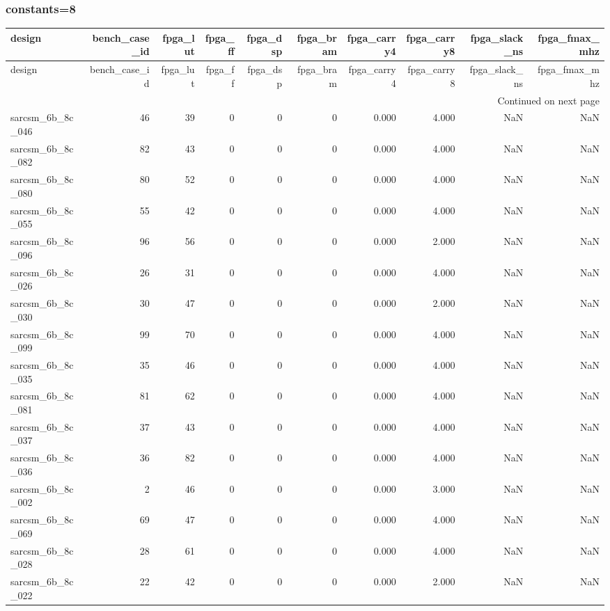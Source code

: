 \documentclass{article}
\begin{document}
\subsubsection*{constants=8}
\begin{longtable}{lrrrrrrrrr}
\toprule
design & bench\_case\_id & fpga\_lut & fpga\_ff & fpga\_dsp & fpga\_bram & fpga\_carry4 & fpga\_carry8 & fpga\_slack\_ns & fpga\_fmax\_mhz \\
\midrule
\endfirsthead
\toprule
design & bench\_case\_id & fpga\_lut & fpga\_ff & fpga\_dsp & fpga\_bram & fpga\_carry4 & fpga\_carry8 & fpga\_slack\_ns & fpga\_fmax\_mhz \\
\midrule
\endhead
\midrule
\multicolumn{10}{r}{Continued on next page} \\
\midrule
\endfoot
\bottomrule
\endlastfoot
sarcsm\_6b\_8c\_046 & 46 & 39 & 0 & 0 & 0 & 0.000 & 4.000 & NaN & NaN \\
sarcsm\_6b\_8c\_082 & 82 & 43 & 0 & 0 & 0 & 0.000 & 4.000 & NaN & NaN \\
sarcsm\_6b\_8c\_080 & 80 & 52 & 0 & 0 & 0 & 0.000 & 4.000 & NaN & NaN \\
sarcsm\_6b\_8c\_055 & 55 & 42 & 0 & 0 & 0 & 0.000 & 4.000 & NaN & NaN \\
sarcsm\_6b\_8c\_096 & 96 & 56 & 0 & 0 & 0 & 0.000 & 2.000 & NaN & NaN \\
sarcsm\_6b\_8c\_026 & 26 & 31 & 0 & 0 & 0 & 0.000 & 4.000 & NaN & NaN \\
sarcsm\_6b\_8c\_030 & 30 & 47 & 0 & 0 & 0 & 0.000 & 2.000 & NaN & NaN \\
sarcsm\_6b\_8c\_099 & 99 & 70 & 0 & 0 & 0 & 0.000 & 4.000 & NaN & NaN \\
sarcsm\_6b\_8c\_035 & 35 & 46 & 0 & 0 & 0 & 0.000 & 4.000 & NaN & NaN \\
sarcsm\_6b\_8c\_081 & 81 & 62 & 0 & 0 & 0 & 0.000 & 4.000 & NaN & NaN \\
sarcsm\_6b\_8c\_037 & 37 & 43 & 0 & 0 & 0 & 0.000 & 4.000 & NaN & NaN \\
sarcsm\_6b\_8c\_036 & 36 & 82 & 0 & 0 & 0 & 0.000 & 4.000 & NaN & NaN \\
sarcsm\_6b\_8c\_002 & 2 & 46 & 0 & 0 & 0 & 0.000 & 3.000 & NaN & NaN \\
sarcsm\_6b\_8c\_069 & 69 & 47 & 0 & 0 & 0 & 0.000 & 4.000 & NaN & NaN \\
sarcsm\_6b\_8c\_028 & 28 & 61 & 0 & 0 & 0 & 0.000 & 4.000 & NaN & NaN \\
sarcsm\_6b\_8c\_022 & 22 & 42 & 0 & 0 & 0 & 0.000 & 2.000 & NaN & NaN \\

\end{longtable}
\end{document}

